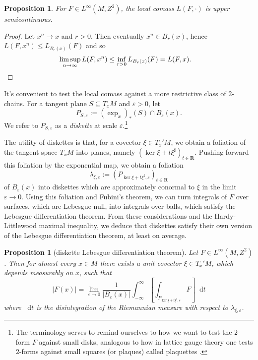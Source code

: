 \documentclass[reqno,11pt]{amsart}
\newcommand{\RR}{\mathbf{R}}
\newcommand*\dif{\mathop{}\!\mathrm{d}}
\newcommand{\dfn}[1]{\emph{#1}\index{#1}}
\newtheorem{proposition}[theorem]{Proposition}
\theoremstyle{definition}
\numberwithin{equation}{section}
\begin{document}
\begin{proposition}
For $F \in L^\infty(M, Z^2)$, the local comass $L(F, \cdot)$ is upper semicontinuous. \label{crandall usc}
\end{proposition}
\begin{proof}
Let $x^n \to x$ and $r > 0$. Then eventually $x^n \in B_r(x)$, hence $L(F, x^n) \leq L_{B_r(x)}(F)$ and so
\begin{align*}
\limsup_{n \to \infty} L(F, x^n) &\leq \inf_{r > 0} L_{B_r(x)}(F) = L(F, x). \qedhere 
\end{align*}
\end{proof}

It's convenient to test the local comass against a more restrictive class of $2$-chains.
For a tangent plane $S \subseteq T_x M$ and $\varepsilon > 0$, let
$$P_{S, \varepsilon} := (\exp_x)_*(S) \cap B_\varepsilon(x).$$
We refer to $P_{S, \varepsilon}$ as a \dfn{diskette} at scale $\varepsilon$.\footnote{The terminology serves to remind ourselves to how we want to test the $2$-form $F$ against small disks, analogous to how in lattice gauge theory one tests $2$-forms against small squares (or plaques) called plaquettes \cite{Gupta98}.}

The utility of diskettes is that, for a covector $\xi \in T_x' M$, we obtain a foliation of the tangent space $T_x M$ into planes, namely $(\ker \xi + t\xi^\sharp)_{t \in \RR}$.
Pushing forward this foliation by the exponential map, we obtain a foliation
$$\lambda_{\xi, \varepsilon} := (P_{\ker \xi + t\xi^\sharp, \varepsilon})_{t \in \RR}$$
of $B_\varepsilon(x)$ into diskettes which are approximately conormal to $\xi$ in the limit $\varepsilon \to 0$.
Using this foliation and Fubini's theorem, we can turn integrals of $F$ over surfaces, which are Lebesgue null, into integrals over balls, which satisfy the Lebesgue differentiation theorem.
From these considerations and the Hardy-Littlewood maximal inequality, we deduce that diskettes satisfy their own version of the Lebesgue differentiation theorem, at least on average.

\begin{proposition}[diskette Lebesgue differentiation theorem]\label{PLDT}
Let $F \in L^\infty(M, Z^2)$.
Then for almost every $x \in M$ there exists a unit covector $\xi \in T_x' M$, which depends measurably on $x$, such that
\begin{equation}\label{diskette LDT}
|F(x)| = \lim_{\varepsilon \to 0} \frac{1}{|B_\varepsilon(x)|} \int_{-\infty}^\infty \left[\int_{P_{\ker \xi + t\xi^\sharp, \varepsilon}} F\right] \dif t
\end{equation}
where $\dif t$ is the disintegration of the Riemannian measure with respect to $\lambda_{\xi, \varepsilon}$.
\end{proposition}
\end{document}
